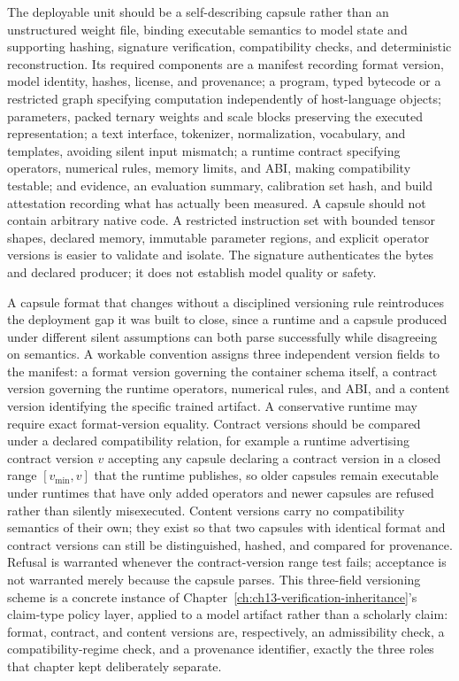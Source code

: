 The deployable unit should be a self-describing capsule rather than an unstructured weight file, binding executable semantics to model state and supporting hashing, signature verification, compatibility checks, and deterministic reconstruction. Its required components are a manifest recording format version, model identity, hashes, license, and provenance; a program, typed bytecode or a restricted graph specifying computation independently of host-language objects; parameters, packed ternary weights and scale blocks preserving the executed representation; a text interface, tokenizer, normalization, vocabulary, and templates, avoiding silent input mismatch; a runtime contract specifying operators, numerical rules, memory limits, and ABI, making compatibility testable; and evidence, an evaluation summary, calibration set hash, and build attestation recording what has actually been measured. A capsule should not contain arbitrary native code. A restricted instruction set with bounded tensor shapes, declared memory, immutable parameter regions, and explicit operator versions is easier to validate and isolate. The signature authenticates the bytes and declared producer; it does not establish model quality or safety.

A capsule format that changes without a disciplined versioning rule reintroduces the deployment gap it was built to close, since a runtime and a capsule produced under different silent assumptions can both parse successfully while disagreeing on semantics. A workable convention assigns three independent version fields to the manifest: a format version governing the container schema itself, a contract version governing the runtime operators, numerical rules, and ABI, and a content version identifying the specific trained artifact. A conservative runtime may require exact format-version equality. Contract versions should be compared under a declared compatibility relation, for example a runtime advertising contract version $v$ accepting any capsule declaring a contract version in a closed range $[v_{\min}, v]$ that the runtime publishes, so older capsules remain executable under runtimes that have only added operators and newer capsules are refused rather than silently misexecuted. Content versions carry no compatibility semantics of their own; they exist so that two capsules with identical format and contract versions can still be distinguished, hashed, and compared for provenance. Refusal is warranted whenever the contract-version range test fails; acceptance is not warranted merely because the capsule parses. This three-field versioning scheme is a concrete instance of Chapter~\ref{ch:ch13-verification-inheritance}'s claim-type policy layer, applied to a model artifact rather than a scholarly claim: format, contract, and content versions are, respectively, an admissibility check, a compatibility-regime check, and a provenance identifier, exactly the three roles that chapter kept deliberately separate.

